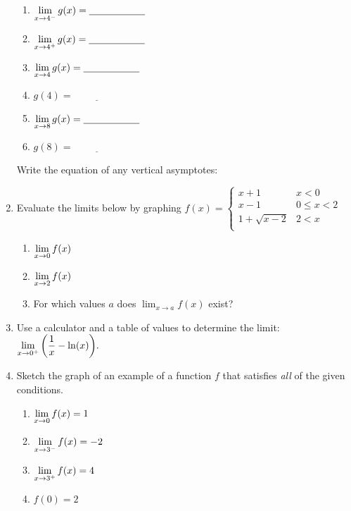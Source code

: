 \documentclass[11pt,fleqn]{article}
\begin{document}
\begin{enumerate}
\begin{multicols}{2}
\columnbreak
\begin{enumerate}
\item $\displaystyle{\lim_{x \to 4^-} g(x) = \underline{\hspace{2cm}} }$
\item $\displaystyle{\lim_{x \to 4^+} g(x) = \underline{\hspace{2cm}} }$
\item $\displaystyle{\lim_{x \to 4} g(x) = \underline{\hspace{2cm}} }$
\item $g(4)= \underline{\hspace{2cm}}$
\item $\displaystyle{\lim_{x \to 8} g(x) = \underline{\hspace{2cm}} }$
\item $g(8)= \underline{\hspace{2cm}}$
\end{enumerate}
\end{multicols}

Write the equation of any vertical asymptotes:\\

\vfill
\newpage
\item Evaluate the limits below by graphing $f(x)=\begin{cases} x+1 & x < 0 \\ 
x -1 & 0 \leq x < 2 \\
1+\sqrt{x-2}& 2<x \\
\end{cases}$

\begin{enumerate}
\item $\displaystyle{\lim_{x \to 0} f(x)}$
\vspace{.7in}
\item $\displaystyle{\lim_{x \to 2} f(x)}$
\vspace{.7in}
\item For which values $a$ does $\lim_{x \to a} f(x)$ exist?
\end{enumerate}

\item Use a calculator and a table of values to determine the limit: $\displaystyle{\lim_{x \to 0^+} \left(\frac{1}{x} - \ln (x)\right)}.$
\vfill
\item Sketch the graph of an example of a function $f$ that satisfies \emph{all} of the given conditions.
\begin{enumerate}
\item $\displaystyle{\lim_{x \to 0}f(x)}=1$
\item $\displaystyle{\lim_{x \to 3^-} f(x)= -2}$
\item $\displaystyle{\lim_{x \to 3^+} f(x)= 4}$
\item $f(0)=2$


\end{enumerate}
\end{enumerate}
\end{document}
